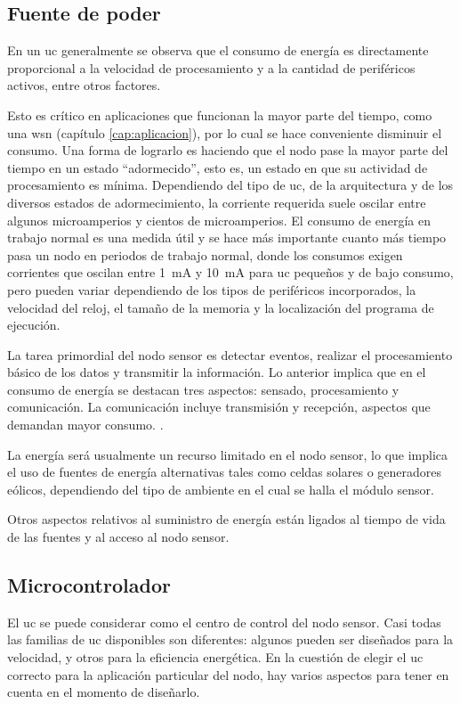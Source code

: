 \subsection{Fuente de poder}

En un \gls{uc} generalmente se observa que el consumo de energía es directamente proporcional a la velocidad de procesamiento y a la cantidad de periféricos activos, entre otros factores. 

Esto es crítico en aplicaciones que funcionan la mayor parte del tiempo, como una \gls{wsn} (capítulo \ref{cap:aplicacion}), por lo cual se hace conveniente disminuir el consumo. Una forma de lograrlo es haciendo que el nodo pase la mayor parte del tiempo en un estado ``adormecido'', esto es, un estado en que su actividad de procesamiento es mínima. Dependiendo del tipo de \gls{uc}, de la arquitectura y de los diversos estados de adormecimiento, la corriente requerida suele oscilar entre algunos microamperios y cientos de microamperios. El consumo de energía en trabajo normal es una medida útil y se hace más importante cuanto más tiempo pasa un nodo en periodos de trabajo normal, donde los consumos exigen corrientes que oscilan entre \SI{1}{mA} y \SI{10}{mA} para \gls{uc} pequeños y de bajo consumo, pero pueden variar dependiendo de los tipos de periféricos incorporados, la velocidad del reloj, el tamaño de la memoria y la localización del programa de ejecución.

La tarea primordial del nodo sensor es detectar eventos, realizar el procesamiento básico de los datos y transmitir la información. Lo anterior implica que en el consumo de energía se destacan tres aspectos: sensado, procesamiento y comunicación. La comunicación incluye transmisión y recepción, aspectos que demandan mayor consumo. \cite{Akyildiz-2002}.

La energía será usualmente un recurso limitado en el nodo sensor, lo que implica el uso de fuentes de energía alternativas tales como celdas solares o generadores eólicos, dependiendo del tipo de ambiente en el cual se halla el módulo sensor.

Otros aspectos relativos al suministro de energía están ligados al tiempo de vida de las fuentes y al acceso al nodo sensor. 

\subsection{Microcontrolador}

El \gls{uc} se puede considerar como el centro de control del nodo sensor. Casi todas las familias de \gls{uc} disponibles son diferentes: algunos pueden ser diseñados para la velocidad, y otros para la eficiencia energética. En la cuestión de elegir el \gls{uc} correcto para la aplicación particular del nodo, hay varios aspectos para tener en cuenta en el momento de diseñarlo.

